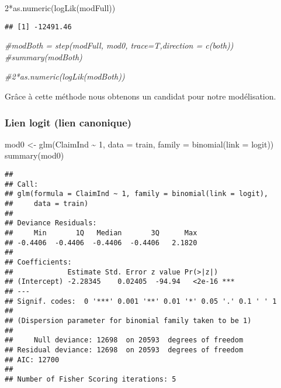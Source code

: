 \documentclass[
]{article}
\newenvironment{Shaded}{\begin{snugshade}}{\end{snugshade}}
\newcommand{\AttributeTok}[1]{\textcolor[rgb]{0.77,0.63,0.00}{#1}}
\newcommand{\CommentTok}[1]{\textcolor[rgb]{0.56,0.35,0.01}{\textit{#1}}}
\newcommand{\DecValTok}[1]{\textcolor[rgb]{0.00,0.00,0.81}{#1}}
\newcommand{\FunctionTok}[1]{\textcolor[rgb]{0.00,0.00,0.00}{#1}}
\newcommand{\NormalTok}[1]{#1}
\newcommand{\OtherTok}[1]{\textcolor[rgb]{0.56,0.35,0.01}{#1}}
\newcommand{\SpecialCharTok}[1]{\textcolor[rgb]{0.00,0.00,0.00}{#1}}
\begin{document}
\begin{Shaded}
\begin{Highlighting}[]
\DecValTok{2}\SpecialCharTok{*}\FunctionTok{as.numeric}\NormalTok{(}\FunctionTok{logLik}\NormalTok{(modFull))}
\end{Highlighting}
\end{Shaded}

\begin{verbatim}
## [1] -12491.46
\end{verbatim}

\begin{Shaded}
\begin{Highlighting}[]
\CommentTok{\#modBoth = step(modFull, mod0, trace=T,direction = c(\textquotesingle{}both\textquotesingle{}))}
\CommentTok{\#summary(modBoth)}
\end{Highlighting}
\end{Shaded}

\begin{Shaded}
\begin{Highlighting}[]
\CommentTok{\#2*as.numeric(logLik(modBoth))}
\end{Highlighting}
\end{Shaded}

Grâce à cette méthode nous obtenons un candidat pour notre modélisation.

\hypertarget{lien-logit-lien-canonique}{%
\subsubsection{Lien logit (lien
canonique)}\label{lien-logit-lien-canonique}}

\begin{Shaded}
\begin{Highlighting}[]
\NormalTok{mod0 }\OtherTok{\textless{}{-}} \FunctionTok{glm}\NormalTok{(ClaimInd }\SpecialCharTok{\textasciitilde{}} \DecValTok{1}\NormalTok{, }\AttributeTok{data =}\NormalTok{ train, }\AttributeTok{family =} \FunctionTok{binomial}\NormalTok{(}\AttributeTok{link =}\NormalTok{ logit))}
\FunctionTok{summary}\NormalTok{(mod0)}
\end{Highlighting}
\end{Shaded}

\begin{verbatim}
## 
## Call:
## glm(formula = ClaimInd ~ 1, family = binomial(link = logit), 
##     data = train)
## 
## Deviance Residuals: 
##     Min       1Q   Median       3Q      Max  
## -0.4406  -0.4406  -0.4406  -0.4406   2.1820  
## 
## Coefficients:
##             Estimate Std. Error z value Pr(>|z|)    
## (Intercept) -2.28345    0.02405  -94.94   <2e-16 ***
## ---
## Signif. codes:  0 '***' 0.001 '**' 0.01 '*' 0.05 '.' 0.1 ' ' 1
## 
## (Dispersion parameter for binomial family taken to be 1)
## 
##     Null deviance: 12698  on 20593  degrees of freedom
## Residual deviance: 12698  on 20593  degrees of freedom
## AIC: 12700
## 
## Number of Fisher Scoring iterations: 5
\end{verbatim}
\end{document}
